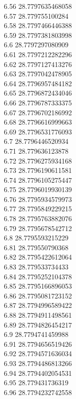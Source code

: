 {6.56	28.7797635468058\\
6.57	28.779755100284\\
6.58	28.7797466446388\\
6.59	28.7797381803998\\
6.6	28.7797297080909\\
6.61	28.7797212282296\\
6.62	28.7797127413276\\
6.63	28.7797042478905\\
6.64	28.7796957484182\\
6.65	28.7796872434046\\
6.66	28.7796787333375\\
6.67	28.7796702186992\\
6.68	28.7796616999663\\
6.69	28.7796531776093\\
6.7	28.7796446520934\\
6.71	28.779636123878\\
6.72	28.7796275934168\\
6.73	28.7796190611581\\
6.74	28.7796105275447\\
6.75	28.7796019930139\\
6.76	28.7795934579973\\
6.77	28.7795849229215\\
6.78	28.7795763882076\\
6.79	28.7795678542712\\
6.8	28.7795593215229\\
6.81	28.779550790368\\
6.82	28.7795422612064\\
6.83	28.779533734433\\
6.84	28.7795252104378\\
6.85	28.7795166896053\\
6.86	28.7795081723152\\
6.87	28.7794996589422\\
6.88	28.7794911498561\\
6.89	28.7794826454217\\
6.9	28.7794741459988\\
6.91	28.7794656519426\\
6.92	28.7794571636034\\
6.93	28.7794486813266\\
6.94	28.7794402054531\\
6.95	28.779431736319\\
6.96	28.7794232742558\\
}
